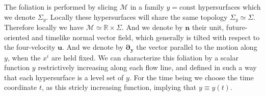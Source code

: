 The foliation is performed by slicing $\mathcal{M}$ in a family $y=\text{const}$ hypersurfaces which we denote $\Sigma_y$. 
Locally these hypersurfaces will share the same topology $\Sigma_y \simeq \Sigma$. 
Therefore locally we have $\mathcal{M}\simeq \mathbb{R}\times \Sigma$. 
And we denote by $\mathbf{n}$ their unit, future-oriented and timelike normal vector field, which generally is tilted with respect to the four-velocity $\mathbf{u}$.
And we denote by $\bm{\partial_y}$ the vector parallel to the motion along $y$, when the $x^i$ are held fixed.
We can characterize this foliation by a scalar function $y$ restrictively increasing along each flow line, and defined in such a way that each hypersurface is a level set of $y$. For the time being we choose the time coordinate $t$, as this stricly increasing function, implying that $y\equiv y(t)$. 


